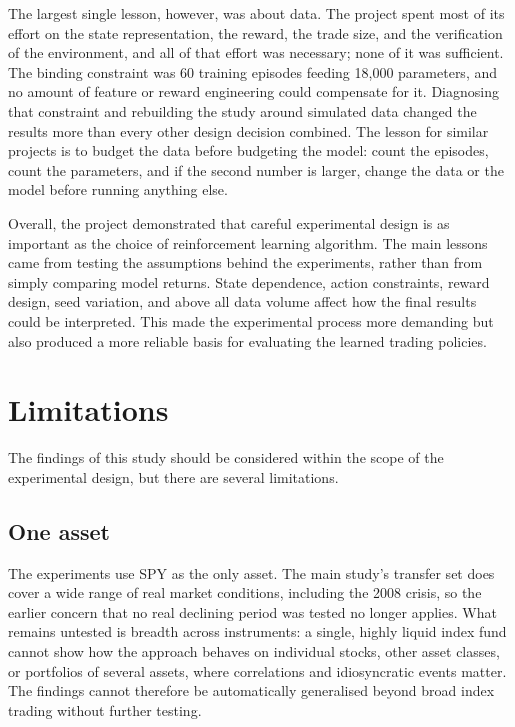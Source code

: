 The largest single lesson, however, was about data. The project spent
most of its effort on the state representation, the reward, the trade
size, and the verification of the environment, and all of that effort
was necessary; none of it was sufficient. The binding constraint was 60
training episodes feeding 18,000 parameters, and no amount of feature or
reward engineering could compensate for it. Diagnosing that constraint
and rebuilding the study around simulated data changed the results more
than every other design decision combined. The lesson for similar
projects is to budget the data before budgeting the model: count the
episodes, count the parameters, and if the second number is larger,
change the data or the model before running anything else.

Overall, the project demonstrated that careful experimental design is as
important as the choice of reinforcement learning algorithm. The main
lessons came from testing the assumptions behind the experiments, rather
than from simply comparing model returns. State dependence, action
constraints, reward design, seed variation, and above all data volume
affect how the final results could be interpreted. This made the
experimental process more demanding but also produced a more reliable
basis for evaluating the learned trading policies.

\section{Limitations}

The findings of this study should be considered within the scope of the
experimental design, but there are several limitations.

\subsection{One asset}

The experiments use SPY as the only asset. The main study's transfer set
does cover a wide range of real market conditions, including the 2008
crisis, so the earlier concern that no real declining period was tested
no longer applies. What remains untested is breadth across instruments:
a single, highly liquid index fund cannot show how the approach behaves
on individual stocks, other asset classes, or portfolios of several
assets, where correlations and idiosyncratic events matter. The findings
cannot therefore be automatically generalised beyond broad index trading
without further testing.

